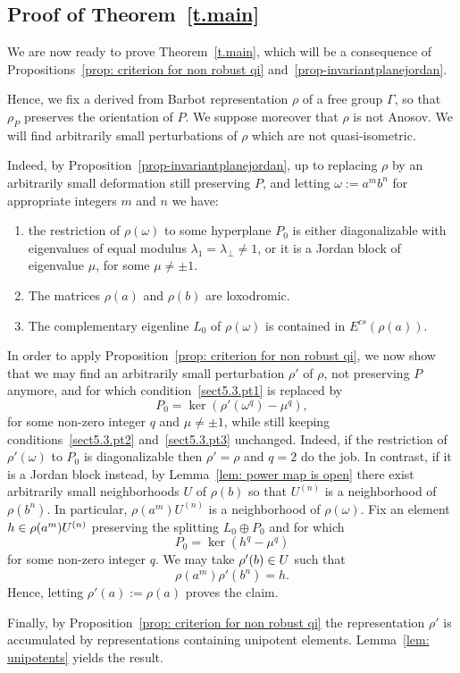 \documentclass[AHL,Unicode,longabstracts]{cedram}
\newcommand{\Ecs}{E^{cs}}
\let\oldin\in
\renewcommand{\in}{\mathchoice{\oldin}{\oldin}{\,\oldin\,}{\,\oldin\,}}
\begin{document}
\subsection{Proof of Theorem~\ref{t.main}} \label{subsec: proof of main thm}



We are now ready to prove Theorem~\ref{t.main}, which will be a consequence of Propositions~\ref{prop: criterion for non robust qi} and~\ref{prop-invariantplanejordan}.

Hence, we fix a derived from Barbot representation $\rho$ of a free group $\Gamma$, so that $\rho_P$ preserves the orientation of $P$. We suppose moreover that $\rho$ is not Anosov. We will find arbitrarily small perturbations of $\rho$ which are not quasi-isometric.

Indeed, by Proposition~\ref{prop-invariantplanejordan}, up to replacing $\rho$ by an arbitrarily small deformation still preserving $P$, and letting $\omega:=a^mb^n$ for appropriate integers $m$ and $n$ we have:
\begin{enumerate}
\item\label{sect5.3.pt1} the restriction of $\rho(\omega)$ to some hyperplane $P_0$ is either diagonalizable with eigenvalues of equal modulus $\lambda_1=\lambda_\perp\neq 1$, or it is a Jordan block of eigenvalue $\mu$, for some $\mu\neq \pm 1$.
\item\label{sect5.3.pt2} The matrices $\rho(a)$ and $\rho(b)$ are loxodromic.
\item\label{sect5.3.pt3} The complementary eigenline $L_0$ of $\rho(\omega)$ is contained in $\Ecs(\rho(a))$.
\end{enumerate}

In order to apply Proposition~\ref{prop: criterion for non robust qi}, we now show that we may find an arbitrarily small perturbation $\rho'$ of $\rho$, not preserving $P$ anymore, and for which condition~\eqref{sect5.3.pt1} is replaced by
\[
P_0=\ker(\rho' (\omega^q)-\mu^q),
\]
for some non-zero integer $q$ and $\mu\neq\pm 1$, while still keeping conditions~\eqref{sect5.3.pt2} and~\eqref{sect5.3.pt3} unchanged.
Indeed, if the restriction of $\rho'(\omega)$ to $P_0$ is diagonalizable then $\rho'=\rho$ and $q=2$ do the job. In contrast, if it is a Jordan block instead, by Lemma~\ref{lem: power map is open} there exist arbitrarily small neighborhoods $U$ of $\rho(b)$ so that $U^{(n)}$ is a neighborhood of $\rho(b^n)$. In particular, $\rho(a^m)U^{(n)}$ is a neighborhood of $\rho(\omega)$.
Fix an element $h\in \rho(a^m)U^{(n)}$ preserving the splitting $L_0\oplus P_0$ and for which
\[
P_0=\ker(h^q-\mu^q)
\]
for some non-zero integer $q$.
We may take $\rho'(b)\in U$ such that
\[
\rho(a^m)\rho'(b^n)=h.
\]
Hence, letting $\rho'(a):=\rho(a)$ proves the claim.


Finally, by Proposition~\ref{prop: criterion for non robust qi} the representation $\rho'$ is accumulated by representations containing unipotent elements. Lemma~\ref{lem: unipotents} yields the result.

\let\OLDthebibliography\thebibliography
\renewcommand\thebibliography[1]{
\OLDthebibliography{#1}
\setlength{\parskip}{0pt}
\setlength{\itemsep}{7pt plus 0.3ex}}


\end{document}
